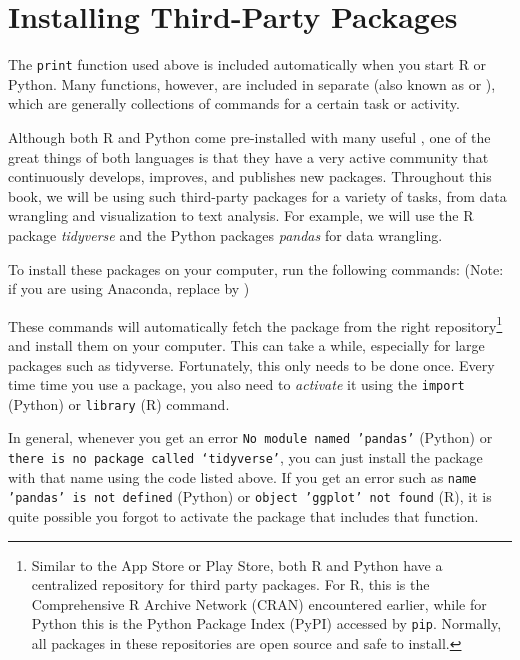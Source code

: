 \section{Installing Third-Party Packages}

The \texttt{print} function used above is included automatically when you start R or Python.
Many functions, however, are included in separate  (also known as  or ), which are
generally collections of commands for a certain task or activity.

Although both R and Python come pre-installed with many useful ,
one of the great things of both languages is that they have a very active community that continuously develops, improves, and publishes new packages.
Throughout this book, we will be using such third-party packages for a variety of tasks, from data wrangling and visualization to text analysis.
For example, we will use the R package \emph{tidyverse} and the Python packages \emph{pandas} for data wrangling.

To install these packages on your computer, run the following commands:
(Note: if you are using Anaconda, replace  by )  

\begin{tcbraster}[raster columns=2,raster equal height=rows,raster valign=top]
\end{tcbraster}


These commands will automatically fetch the package from the right repository\footnote{Similar to the App Store or Play Store, both R and Python have a centralized repository for third party packages.  For R, this is the Comprehensive R Archive Network (CRAN) encountered earlier,
    while for Python this is the Python Package Index (PyPI) accessed by \verb|pip|.  Normally, all packages in these repositories are open source and safe to install.} and install them on your computer. This can take a while, especially for large packages such as tidyverse.
Fortunately, this only needs to be done once.
Every time time you use a package, you also need to \emph{activate} it using the \texttt{import} (Python) or  \texttt{library} (R) command.

In general, whenever you get an error \texttt{No module named 'pandas'} (Python) or \texttt{there is no package called ‘tidyverse’},
you can just install the package with that name using the code listed above.
If you get an error such as \texttt{name 'pandas' is not defined} (Python) or \texttt{object 'ggplot' not found} (R),
it is quite possible you forgot to activate the package that includes that function. 


